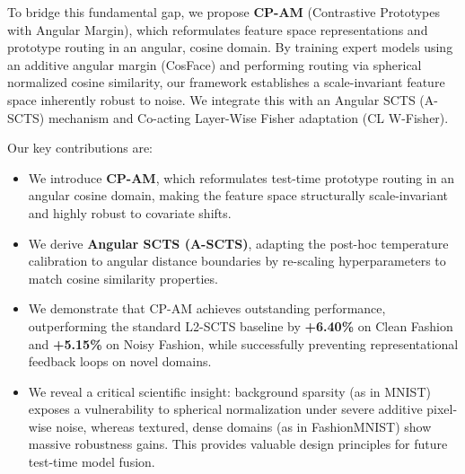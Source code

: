 \documentclass{article}
\theoremstyle{plain}
\theoremstyle{definition}
\theoremstyle{remark}
\begin{document}
To bridge this fundamental gap, we propose \textbf{CP-AM} (Contrastive Prototypes with Angular Margin), which reformulates feature space representations and prototype routing in an angular, cosine domain. By training expert models using an additive angular margin (CosFace) \cite{wang2018cosface} and performing routing via spherical normalized cosine similarity, our framework establishes a scale-invariant feature space inherently robust to noise. We integrate this with an Angular SCTS (A-SCTS) mechanism and Co-acting Layer-Wise Fisher adaptation (CL W-Fisher).

Our key contributions are:
\begin{itemize}
\item We introduce \textbf{CP-AM}, which reformulates test-time prototype routing in an angular cosine domain, making the feature space structurally scale-invariant and highly robust to covariate shifts.
\item We derive \textbf{Angular SCTS (A-SCTS)}, adapting the post-hoc temperature calibration to angular distance boundaries by re-scaling hyperparameters to match cosine similarity properties.
\item We demonstrate that CP-AM achieves outstanding performance, outperforming the standard L2-SCTS baseline by \textbf{+6.40\%} on Clean Fashion and \textbf{+5.15\%} on Noisy Fashion, while successfully preventing representational feedback loops on novel domains.
\item We reveal a critical scientific insight: background sparsity (as in MNIST) exposes a vulnerability to spherical normalization under severe additive pixel-wise noise, whereas textured, dense domains (as in FashionMNIST) show massive robustness gains. This provides valuable design principles for future test-time model fusion.
\end{itemize}
\end{document}
